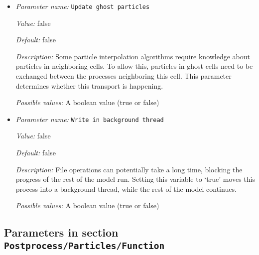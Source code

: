 \begin{itemize}
{\it Default:} 1e8


{\it Description:} The time interval between each generation of output files. A value of zero indicates that output should be generated every time step.

Units: years if the 'Use years in output instead of seconds' parameter is set; seconds otherwise.


{\it Possible values:} A floating point number $v$ such that $0 \leq v \leq \text{MAX\_DOUBLE}$
\item {\it Parameter name:} {\tt Update ghost particles}
\label{parameters:Postprocess/Particles/Update ghost particles}
\label{parameters:Postprocess/Particles/Update_20ghost_20particles}


{\it Value:} false


{\it Default:} false


{\it Description:} Some particle interpolation algorithms require knowledge about particles in neighboring cells. To allow this, particles in ghost cells need to be exchanged between the processes neighboring this cell. This parameter determines whether this transport is happening.


{\it Possible values:} A boolean value (true or false)
\item {\it Parameter name:} {\tt Write in background thread}
\label{parameters:Postprocess/Particles/Write in background thread}
\label{parameters:Postprocess/Particles/Write_20in_20background_20thread}


{\it Value:} false


{\it Default:} false


{\it Description:} File operations can potentially take a long time, blocking the progress of the rest of the model run. Setting this variable to `true' moves this process into a background thread, while the rest of the model continues.


{\it Possible values:} A boolean value (true or false)
\end{itemize}



\subsection{Parameters in section \tt Postprocess/Particles/Function}
\label{parameters:Postprocess/Particles/Function}

